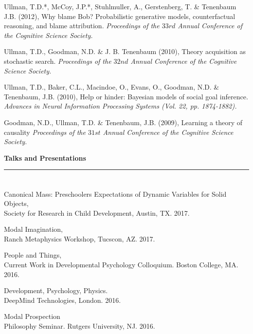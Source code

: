 \documentclass[margin,line,pifont,palatino,courier]{res}
\begin{document}
\begin{resume}
Ullman, T.D.*, McCoy, J.P.*, Stuhlmuller, A., Gerstenberg, T. \& Tenenbaum J.B. (2012), Why blame Bob? Probabilistic generative models, counterfactual reasoning, and blame attribution. \textit{Proceedings of the $33rd$ Annual Conference of the Cognitive Science Society.}

Ullman, T.D., Goodman, N.D. \& J. B. Tenenbaum (2010), Theory acquisition as stochastic search. \textit{Proceedings of the $32nd$ Annual Conference of the Cognitive Science Society.}

Ullman, T.D., Baker, C.L., Macindoe, O., Evans, O., Goodman, N.D. \& Tenenbaum, J.B. (2010), Help or hinder: Bayesian models of social goal inference. \textit{Advances in Neural Information Processing Systems (Vol. 22, pp. 1874-1882).}

Goodman, N.D., Ullman, T.D. \& Tenenbaum, J.B. (2009), Learning a theory of causality \textit{Proceedings of the $31st$ Annual Conference of the Cognitive Science Society.}

\vspace{20pt}
\begin{adjustwidth*}{-3.3cm}{-2cm}

\hspace{-3.8em}\textbf{Talks and Presentations}\\
\hspace*{-3.8em}\noindent\rule{8cm}{0.4pt}

\end{adjustwidth*}

\section{\sc }

Canonical Mass: Preschoolers Expectations of Dynamic Variables for Solid Objects,\\
Society for Research in Child Development, Austin, TX. 2017.

Modal Imagination,\\ Ranch Metaphysics Workshop, Tucscon, AZ. 2017.

People and Things,\\ Current Work in Developmental Psychology Colloquium. Boston College, MA. 2016. 

Development, Psychology, Physics. \\DeepMind Technologies, London. 2016. 

Modal Prospection \\ Philosophy Seminar. Rutgers University, NJ. 2016.


\end{resume}
\end{document}

